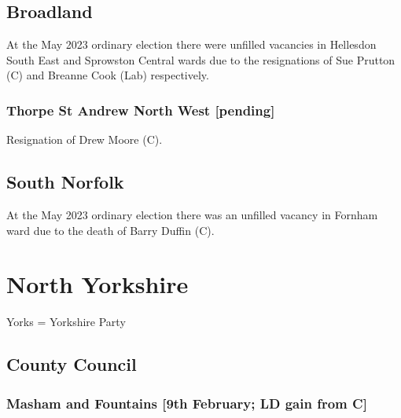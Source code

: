 \documentclass[a4paper,openany]{book}
\begin{document}
\begin{resultsiii}
\subsection*{Broadland}

At the May 2023 ordinary election there were unfilled vacancies in Hellesdon South East and Sprowston Central wards due to the resignations of Sue Prutton (C) and Breanne Cook (Lab) respectively.%
%

\subsubsection*{Thorpe St Andrew North West \hspace*{\fill}\nolinebreak[1]%
	\enspace\hspace*{\fill}
	[pending]}


Resignation of Drew Moore (C).

\subsection*{South Norfolk}

At the May 2023 ordinary election there was an unfilled vacancy in Fornham ward due to the death of Barry Duffin (C).%

\section{North Yorkshire}

Yorks = Yorkshire Party

\subsection*{County Council}

\subsubsection*{Masham and Fountains \hspace*{\fill}\nolinebreak[1]%
	\enspace\hspace*{\fill}
	[9th February; LD gain from C]}


\end{resultsiii}
\end{document}
